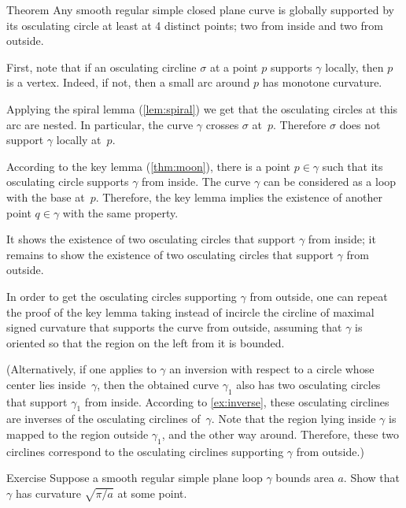 \begin{thm}{Theorem}\label{thm:4-vert-supporting}
Any smooth regular simple closed plane curve is globally supported by its osculating circle at least at 4 distinct points;
two from inside and two from outside.
\end{thm}


First, note that if an osculating circline $\sigma$ at a point $p$ supports $\gamma$ locally, then $p$ is a vertex.
Indeed, if not, then a small arc around $p$ has monotone curvature.

Applying the spiral lemma (\ref{lem:spiral}) we get that the osculating circles at this arc are nested.
In particular, the curve $\gamma$ crosses $\sigma$ at~$p$. 
Therefore $\sigma$ does not support $\gamma$ locally at~$p$.
\qeds



According to the key lemma (\ref{thm:moon}), there is a point $p\in\gamma$ such that its osculating circle supports $\gamma$ from inside.
The curve $\gamma$ can be considered as a loop with the base at~$p$.
Therefore, the key lemma implies the existence of another point $q\in\gamma$ with the same property.

It shows the existence of two osculating circles that support $\gamma$ from inside;
it remains to show the existence of two osculating circles that support $\gamma$ from outside.

In order to get the osculating circles supporting $\gamma$ from outside, one can repeat the proof of the key lemma taking instead of incircle the circline of maximal signed curvature that supports the curve from outside, assuming that $\gamma$ is oriented so that the region on the left from it is bounded.

(Alternatively, if one applies to $\gamma$ an inversion with respect to a circle whose center lies inside~$\gamma$, then the obtained curve $\gamma_1$ also has  two osculating circles that support $\gamma_1$ from inside.
According to \ref{ex:inverse}, these osculating circlines are inverses of the osculating circlines of~$\gamma$.
Note that the region lying inside $\gamma$ is mapped to the region outside $\gamma_1$, and the other way around.
Therefore, these two circlines correspond to the osculating circlines supporting $\gamma$ from outside.)
\qeds

\begin{thm}{Exercise}\label{ex:moon-area}
Suppose a smooth regular simple plane loop $\gamma$ bounds area $a$.
Show that $\gamma$ has curvature $\sqrt{\pi/a}$ at some point.
\end{thm}

